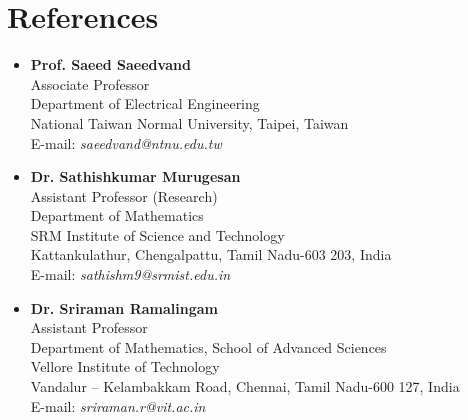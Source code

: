 \documentclass[A4,11pt]{article}
\begin{document}
 \section{\textbf{\huge References}}
 \begin{itemize}
 	\item \textbf{Prof. Saeed Saeedvand}\\
 	Associate Professor\\
 	Department of Electrical Engineering\\
 	National Taiwan Normal University, Taipei, Taiwan\\
 	E-mail: \textit{saeedvand@ntnu.edu.tw}

 	\item \textbf{Dr. Sathishkumar Murugesan}\\
 	Assistant Professor (Research)\\
 	Department of Mathematics\\
 	SRM Institute of Science and Technology\\
 	Kattankulathur, Chengalpattu, Tamil Nadu-603 203, India\\
 	E-mail: \textit{sathishm9@srmist.edu.in}

 	\item \textbf{Dr. Sriraman Ramalingam}\\
 	Assistant Professor \\
 	Department of Mathematics, School of Advanced Sciences\\
 	Vellore Institute of Technology\\
 	Vandalur – Kelambakkam Road, Chennai, Tamil Nadu-600 127, India\\
 	E-mail: \textit{sriraman.r@vit.ac.in}
 \end{itemize}
\end{document}
